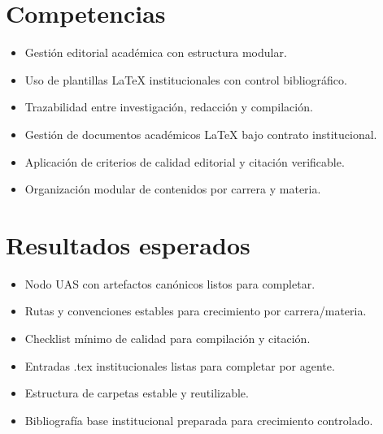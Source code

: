 \documentclass[12pt]{article}
\begin{document}
\section*{Competencias}
\begin{itemize}[leftmargin=*]
  \item Gestión editorial académica con estructura modular.
  \item Uso de plantillas LaTeX institucionales con control bibliográfico.
  \item Trazabilidad entre investigación, redacción y compilación.
  \item Gestión de documentos académicos LaTeX bajo contrato institucional.
  \item Aplicación de criterios de calidad editorial y citación verificable.
  \item Organización modular de contenidos por carrera y materia.
\end{itemize}

\section*{Resultados esperados}
\begin{itemize}[leftmargin=*]
  \item Nodo UAS con artefactos canónicos listos para completar.
  \item Rutas y convenciones estables para crecimiento por carrera/materia.
  \item Checklist mínimo de calidad para compilación y citación.
  \item Entradas .tex institucionales listas para completar por agente.
  \item Estructura de carpetas estable y reutilizable.
  \item Bibliografía base institucional preparada para crecimiento controlado.
\end{itemize}
\end{document}
